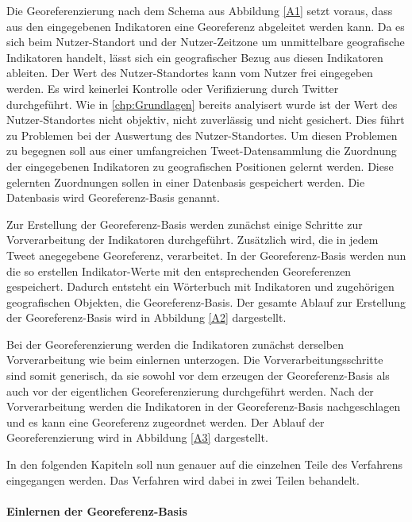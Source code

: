 	Die Georeferenzierung nach dem Schema aus Abbildung \ref{A1} setzt voraus, dass aus den eingegebenen Indikatoren eine Georeferenz abgeleitet werden kann.
	Da es sich beim Nutzer-Standort und der Nutzer-Zeitzone um unmittelbare geografische Indikatoren handelt, lässt sich ein geografischer Bezug aus diesen Indikatoren ableiten.      
	Der Wert des Nutzer-Standortes kann vom Nutzer frei eingegeben werden.
	Es wird keinerlei Kontrolle oder Verifizierung durch Twitter durchgeführt.
	Wie in \ref{chp:Grundlagen} bereits analyisert wurde ist der Wert des Nutzer-Standortes nicht objektiv, nicht zuverlässig und nicht gesichert.
	Dies führt zu Problemen bei der Auswertung des Nutzer-Standortes.
	Um diesen Problemen zu begegnen soll aus einer umfangreichen Tweet-Datensammlung die Zuordnung der eingegebenen Indikatoren zu geografischen Positionen gelernt werden.
	Diese gelernten Zuordnungen sollen in einer Datenbasis gespeichert werden.
	Die Datenbasis wird Georeferenz-Basis genannt.
	
	Zur Erstellung der Georeferenz-Basis werden zunächst einige Schritte zur Vorverarbeitung der Indikatoren durchgeführt.
	Zusätzlich wird, die in jedem Tweet anegegebene Georeferenz, verarbeitet.
	In der Georeferenz-Basis werden nun die so erstellen Indikator-Werte mit den entsprechenden Georeferenzen gespeichert.
	Dadurch entsteht ein Wörterbuch mit Indikatoren und zugehörigen geografischen Objekten, die Georeferenz-Basis.
	Der gesamte Ablauf zur Erstellung der Georeferenz-Basis wird in Abbildung \ref{A2} dargestellt.

	Bei der Georeferenzierung werden die Indikatoren zunächst derselben Vorverarbeitung wie beim einlernen unterzogen.
	Die Vorverarbeitungsschritte sind somit generisch, da sie sowohl vor dem erzeugen der Georeferenz-Basis als auch vor der eigentlichen Georeferenzierung durchgeführt werden.
	Nach der Vorverarbeitung werden die Indikatoren in der Georeferenz-Basis nachgeschlagen und es kann eine Georeferenz zugeordnet werden.
	Der Ablauf der Georeferenzierung wird in Abbildung \ref{A3} dargestellt. 


		In den folgenden Kapiteln soll nun genauer auf die einzelnen Teile des Verfahrens eingegangen werden. 
		Das Verfahren wird dabei in zwei Teilen behandelt.

	\paragraph{Einlernen der Georeferenz-Basis}  

